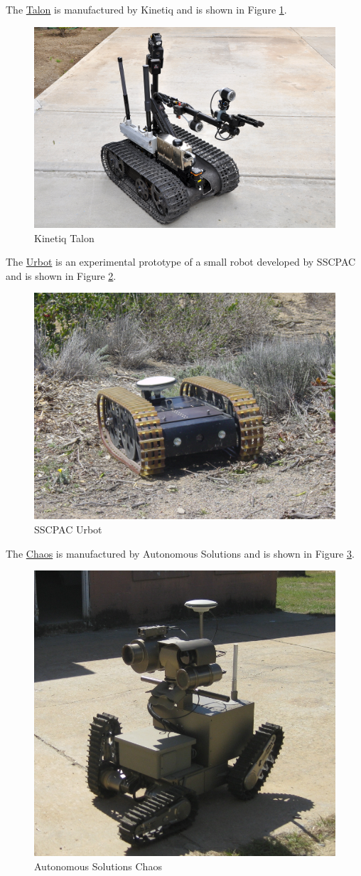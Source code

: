 The \href{http://www.foster-miller.com/lemming.htm}{Talon} is manufactured by Kinetiq and is shown in Figure \ref{fig:talon}.

\begin{figure}[ht!]
	\centering
	\includegraphics[width=.3\textwidth]{images/talonRetrotraverse}
	\caption{Kinetiq Talon}
	\label{fig:talon}
\end{figure}

The \href{http://www.spawar.navy.mil/robots/land/mprs/mprs.html}{Urbot} is an experimental prototype of a small robot developed by SSCPAC and is shown in Figure \ref{fig:urbot}.

\begin{figure}[ht!]
	\centering
	\includegraphics[width=.3\textwidth]{images/urbotWithGps}
	\caption{SSCPAC Urbot}
	\label{fig:urbot}
\end{figure}

The \href{http://www.autonomoussolutions.com/products/chaos.php}{Chaos} is manufactured by Autonomous Solutions and is shown in Figure \ref{fig:chaos}.

\begin{figure}[ht!]
	\centering
	\includegraphics[width=.3\textwidth]{images/chaos}
	\caption{Autonomous Solutions Chaos}
	\label{fig:chaos}
\end{figure}


